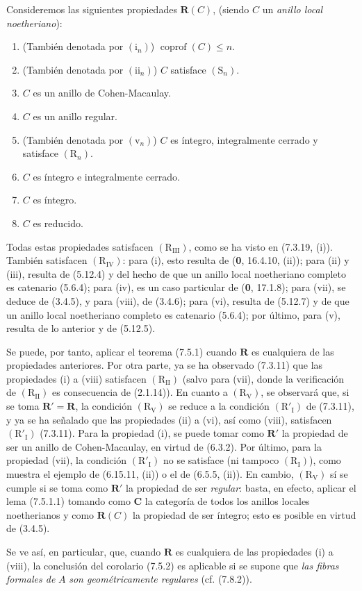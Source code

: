 \begin{examples}[7.5.3]
\label{IV.2.s7.5.3-fr}
Consideremos las siguientes propiedades $\boldsymbol R(C)$, (siendo $C$ un \emph{anillo
local noetheriano}):
\begin{enumerate}
\item[(i)] (También denotada por $(\mathrm i_n)$)
$\operatorname{coprof}(C)\leq n$.
\item[(ii)] (También denotada por $(\mathrm{ii}_n)$) $C$
satisface $(\mathrm S_n)$.
\item[(iii)] $C$ es un anillo de Cohen-Macaulay.
\item[(iv)] $C$ es un anillo regular.
\item[(v)] (También denotada por $(\mathrm v_n)$) $C$ es íntegro,
integralmente cerrado y satisface $(\mathrm R_n)$.
\item[(vi)] $C$ es íntegro e integralmente cerrado.
\item[(vii)] $C$ es íntegro.
\item[(viii)] $C$ es reducido.
\end{enumerate}
Todas estas propiedades satisfacen $(\mathrm R_{\mathrm{III}})$,
como se ha visto en (7.3.19, (i)). También satisfacen
$(\mathrm R_{\mathrm{IV}})$: para (i), esto resulta de
(\textbf 0, 16.4.10, (ii)); para (ii) y (iii), resulta de (5.12.4) y del hecho
de que un anillo local noetheriano completo es catenario (5.6.4);
para (iv), es un caso particular de (\textbf 0, 17.1.8); para (vii), se deduce
de (3.4.5), y para (viii), de (3.4.6); para (vi), resulta de (5.12.7)
y de que un anillo local noetheriano completo es catenario (5.6.4);
por último, para (v), resulta de lo anterior y de (5.12.5).

Se puede, por tanto, aplicar el teorema (7.5.1) cuando $\boldsymbol R$
es cualquiera de las propiedades anteriores. Por otra parte, ya
se ha observado (7.3.11) que las propiedades (i) a (viii) satisfacen
$(\mathrm R_{\mathrm{II}})$ (salvo para (vii), donde la verificación de
$(\mathrm R_{\mathrm{II}})$ es consecuencia de (2.1.14)). En cuanto a
$(\mathrm R_{\mathrm V})$, se observará que, si se toma
$\boldsymbol R'=\boldsymbol R$, la condición
$(\mathrm R_{\mathrm V})$ se reduce a la condición
$(\mathrm R'_{\mathrm I})$ de (7.3.11), y ya se ha señalado que las
propiedades (ii) a (vi), así como (viii), satisfacen
$(\mathrm R'_{\mathrm I})$ (7.3.11). Para la propiedad (i), se puede
tomar como $\boldsymbol R'$ la propiedad de ser un anillo de
Cohen-Macaulay, en virtud de (6.3.2). Por último, para la propiedad
(vii), la condición $(\mathrm R'_{\mathrm I})$ no se satisface
(ni tampoco $(\mathrm R_{\mathrm I})$), como muestra el ejemplo de
(6.15.11, (ii)) o el de (6.5.5, (ii)). En cambio,
$(\mathrm R_{\mathrm V})$ sí se cumple si se toma como
$\boldsymbol R'$ la propiedad de ser \emph{regular}: basta, en efecto,
aplicar el lema (7.5.1.1) tomando como $\boldsymbol{C}$ la categoría de
todos los anillos locales noetherianos y como $\boldsymbol R(C)$ la
propiedad de ser íntegro; esto es posible en virtud de (3.4.5).

Se ve así, en particular, que, cuando $\boldsymbol R$ es cualquiera
de las propiedades (i) a (viii), la conclusión del corolario (7.5.2)
es aplicable si se supone que \emph{las fibras formales de} $A$ \emph{son
geométricamente regulares} (cf. (7.8.2)).
\end{examples}
